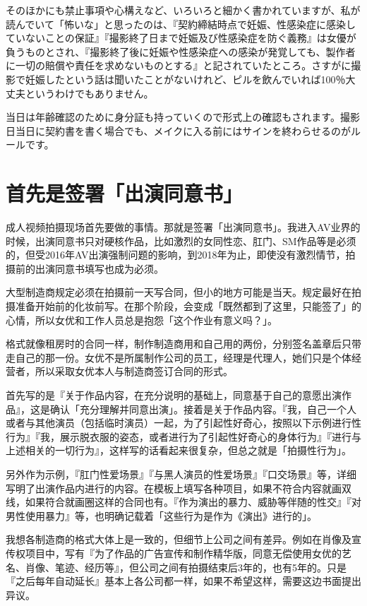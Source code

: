 \documentclass[12pt,UTF8]{ctexbook}
\begin{document}
そのほかにも禁止事項や心構えなど、いろいろと細かく書かれていますが、私が読んでいて「怖いな」と思ったのは、『契約締結時点で妊娠、性感染症に感染していないことの保証』『撮影終了日まで妊娠及び性感染症を防ぐ義務』は女優が負うものとされ、『撮影終了後に妊娠や性感染症への感染が発覚しても、製作者に一切の賠償や責任を求めないものとする』と記されていたところ。さすがに撮影で妊娠したという話は聞いたことがないけれど、ピルを飲んでいれば100％大丈夫というわけでもありません。

当日は年齢確認のために身分証も持っていくので形式上の確認もされます。撮影日当日に契約書を書く場合でも、メイクに入る前にはサインを終わらせるのがルールです。



\section{首先是签署「出演同意书」}

成人视频拍摄现场首先要做的事情。那就是签署「出演同意书」。我进入AV业界的时候，出演同意书只对硬核作品，比如激烈的女同性恋、肛门、SM作品等是必须的，但受2016年AV出演强制问题的影响，到2018年为止，即使没有激烈情节，拍摄前的出演同意书填写也成为必须。

大型制造商规定必须在拍摄前一天写合同，但小的地方可能是当天。规定最好在拍摄准备开始前的化妆前写。在那个阶段，会变成「既然都到了这里，只能签了」的心情，所以女优和工作人员总是抱怨「这个作业有意义吗？」。

格式就像租房时的合同一样，制作制造商用和自己用的两份，分别签名盖章后只带走自己的那一份。女优不是所属制作公司的员工，经理是代理人，她们只是个体经营者，所以采取女优本人与制造商签订合同的形式。

首先写的是『关于作品内容，在充分说明的基础上，同意基于自己的意愿出演作品』，这是确认「充分理解并同意出演」。接着是关于作品内容。『我，自己一个人或者与其他演员（包括临时演员）一起，为了引起性好奇心，按照以下示例进行性行为』『我，展示脱衣服的姿态，或者进行为了引起性好奇心的身体行为』『进行与上述相关的一切行为』，这样写的话看起来很复杂，但总之就是「拍摄性行为」。

另外作为示例，『肛门性爱场景』『与黑人演员的性爱场景』『口交场景』等，详细写明了出演作品内进行的内容。在模板上填写各种项目，如果不符合内容就画双线，如果符合就画圈这样的合同也有。『作为演出的暴力、威胁等伴随的性交』『对男性使用暴力』等，也明确记载着「这些行为是作为《演出》进行的」。

我想各制造商的格式大体上是一致的，但细节上公司之间有差异。例如在肖像及宣传权项目中，写有『为了作品的广告宣传和制作精华版，同意无偿使用女优的艺名、肖像、笔迹、经历等』，但公司之间有拍摄结束后3年的，也有5年的。只是『之后每年自动延长』基本上各公司都一样，如果不希望这样，需要这边书面提出异议。
\end{document}
